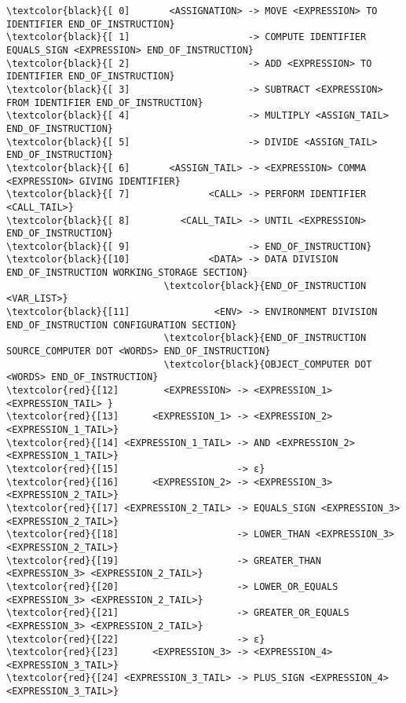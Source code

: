 \begingroup
\fontsize{8pt}{10pt}\selectfont
\begin{Verbatim}[commandchars=\\\{\}]
\textcolor{black}{[ 0]       <ASSIGNATION> -> MOVE <EXPRESSION> TO IDENTIFIER END_OF_INSTRUCTION}
\textcolor{black}{[ 1]                     -> COMPUTE IDENTIFIER EQUALS_SIGN <EXPRESSION> END_OF_INSTRUCTION}
\textcolor{black}{[ 2]                     -> ADD <EXPRESSION> TO IDENTIFIER END_OF_INSTRUCTION}
\textcolor{black}{[ 3]                     -> SUBTRACT <EXPRESSION> FROM IDENTIFIER END_OF_INSTRUCTION}
\textcolor{black}{[ 4]                     -> MULTIPLY <ASSIGN_TAIL> END_OF_INSTRUCTION}
\textcolor{black}{[ 5]                     -> DIVIDE <ASSIGN_TAIL> END_OF_INSTRUCTION}
\textcolor{black}{[ 6]       <ASSIGN_TAIL> -> <EXPRESSION> COMMA <EXPRESSION> GIVING IDENTIFIER}
\textcolor{black}{[ 7]              <CALL> -> PERFORM IDENTIFIER <CALL_TAIL>}
\textcolor{black}{[ 8]         <CALL_TAIL> -> UNTIL <EXPRESSION> END_OF_INSTRUCTION}
\textcolor{black}{[ 9]                     -> END_OF_INSTRUCTION}
\textcolor{black}{[10]              <DATA> -> DATA DIVISION END_OF_INSTRUCTION WORKING_STORAGE SECTION}
                            \textcolor{black}{END_OF_INSTRUCTION <VAR_LIST>}
\textcolor{black}{[11]               <ENV> -> ENVIRONMENT DIVISION END_OF_INSTRUCTION CONFIGURATION SECTION}
                            \textcolor{black}{END_OF_INSTRUCTION SOURCE_COMPUTER DOT <WORDS> END_OF_INSTRUCTION}
                            \textcolor{black}{OBJECT_COMPUTER DOT <WORDS> END_OF_INSTRUCTION}
\textcolor{red}{[12]        <EXPRESSION> -> <EXPRESSION_1> <EXPRESSION_TAIL> }
\textcolor{red}{[13]      <EXPRESSION_1> -> <EXPRESSION_2> <EXPRESSION_1_TAIL>}
\textcolor{red}{[14] <EXPRESSION_1_TAIL> -> AND <EXPRESSION_2> <EXPRESSION_1_TAIL>}
\textcolor{red}{[15]                     -> ε}
\textcolor{red}{[16]      <EXPRESSION_2> -> <EXPRESSION_3> <EXPRESSION_2_TAIL>}
\textcolor{red}{[17] <EXPRESSION_2_TAIL> -> EQUALS_SIGN <EXPRESSION_3> <EXPRESSION_2_TAIL>}
\textcolor{red}{[18]                     -> LOWER_THAN <EXPRESSION_3> <EXPRESSION_2_TAIL>}
\textcolor{red}{[19]                     -> GREATER_THAN <EXPRESSION_3> <EXPRESSION_2_TAIL>}
\textcolor{red}{[20]                     -> LOWER_OR_EQUALS <EXPRESSION_3> <EXPRESSION_2_TAIL>}
\textcolor{red}{[21]                     -> GREATER_OR_EQUALS <EXPRESSION_3> <EXPRESSION_2_TAIL>}
\textcolor{red}{[22]                     -> ε}
\textcolor{red}{[23]      <EXPRESSION_3> -> <EXPRESSION_4> <EXPRESSION_3_TAIL>}
\textcolor{red}{[24] <EXPRESSION_3_TAIL> -> PLUS_SIGN <EXPRESSION_4> <EXPRESSION_3_TAIL>}

\end{Verbatim}
